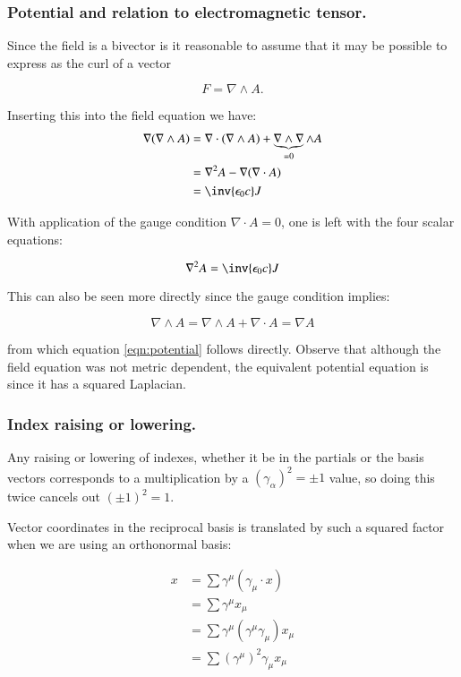 \documentclass{article}
\newcommand{\grad}[0]{\nabla}
\begin{document}
\subsubsection{ Potential and relation to electromagnetic tensor. }

Since the field is a bivector is it reasonable to assume that it may be possible to express as the curl of a vector

\begin{equation*}
F = \grad \wedge A.
\end{equation*}

Inserting this into the field equation we have:
\begin{align*}
\grad (\grad \wedge A)
&= \grad \cdot (\grad \wedge A) + \underbrace{\grad \wedge \grad}_{=0} \wedge A \\
&= \grad^2 A - \grad ( \grad \cdot A ) \\
&= \inv{\epsilon_0 c} J
\end{align*}

With application of the gauge condition $\grad \cdot A = 0$, one is left with the four scalar equations:

\begin{equation}\label{eqn:potential}
\grad^2 A = \inv{\epsilon_0 c} J
\end{equation}

This can also be seen more directly since the gauge condition implies:

\begin{equation*}
\grad \wedge A = \grad \wedge A + \grad \cdot A = \grad A
\end{equation*}

from which equation \ref{eqn:potential} follows directly.  Observe that although the field equation was not metric
dependent, the equivalent potential equation is since it has a squared Laplacian.

\subsubsection{ Index raising or lowering. }
Any raising or lowering of indexes, whether it be in the partials or the basis vectors corresponds to a multiplication by a $(\gamma_{\alpha})^2 = \pm 1$ value, so doing this twice cancels out $(\pm 1)^2 = 1$.

Vector coordinates in the reciprocal basis is translated by such a squared
factor when we are using an orthonormal basis:

\begin{align*}
x
&= \sum \gamma^{\mu} ( \gamma_{\mu} \cdot x ) \\
&= \sum \gamma^{\mu} x_{\mu} \\
&= \sum \gamma^{\mu} (\gamma^{\mu} \gamma_{\mu}) x_{\mu} \\
&= \sum (\gamma^{\mu})^2 \gamma_{\mu} x_{\mu} \\
\end{align*}
\end{document}
